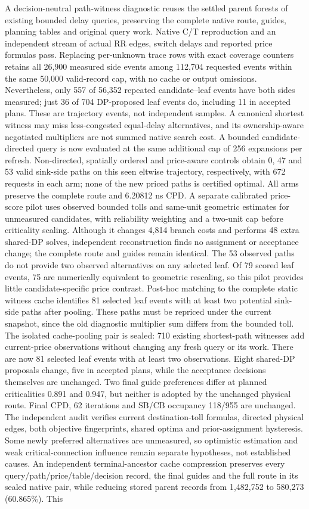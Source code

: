 \documentclass[conference,10pt]{IEEEtran}
\begin{document}
A decision-neutral path-witness diagnostic reuses the settled parent forests of existing bounded delay queries, preserving the complete native route, guides, planning tables and original query work. Native C/T reproduction and an independent stream of actual RR edges, switch delays and reported price formulas pass. Replacing per-unknown trace rows with exact coverage counters retains all 26,900 measured side events among 112,704 requested events within the same 50,000 valid-record cap, with no cache or output omissions. Nevertheless, only 557 of 56,352 repeated candidate--leaf events have both sides measured; just 36 of 704 DP-proposed leaf events do, including 11 in accepted plans. These are trajectory events, not independent samples. A canonical shortest witness may miss less-congested equal-delay alternatives, and its ownership-aware negotiated multipliers are not summed native search cost. A bounded candidate-directed query is now evaluated at the same additional cap of 256 expansions per refresh. Non-directed, spatially ordered and price-aware controls obtain 0, 47 and 53 valid sink-side paths on this seen eltwise trajectory, respectively, with 672 requests in each arm; none of the new priced paths is certified optimal. All arms preserve the complete route and 6.20812 ns CPD. A separate calibrated price-score pilot uses observed bounded tolls and same-unit geometric estimates for unmeasured candidates, with reliability weighting and a two-unit cap before criticality scaling. Although it changes 4,814 branch costs and performs 48 extra shared-DP solves, independent reconstruction finds no assignment or acceptance change; the complete route and guides remain identical. The 53 observed paths do not provide two observed alternatives on any selected leaf. Of 79 scored leaf events, 75 are numerically equivalent to geometric rescaling, so this pilot provides little candidate-specific price contrast. Post-hoc matching to the complete static witness cache identifies 81 selected leaf events with at least two potential sink-side paths after pooling. These paths must be repriced under the current snapshot, since the old diagnostic multiplier sum differs from the bounded toll. The isolated cache-pooling pair is sealed: 710 existing shortest-path witnesses add current-price observations without changing any fresh query or its work. There are now 81 selected leaf events with at least two observations. Eight shared-DP proposals change, five in accepted plans, while the acceptance decisions themselves are unchanged. Two final guide preferences differ at planned criticalities 0.891 and 0.947, but neither is adopted by the unchanged physical route. Final CPD, 62 iterations and SB/CB occupancy 118/955 are unchanged. The independent audit verifies current destination-toll formulas, directed physical edges, both objective fingerprints, shared optima and prior-assignment hysteresis. Some newly preferred alternatives are unmeasured, so optimistic estimation and weak critical-connection influence remain separate hypotheses, not established causes. An independent terminal-ancestor cache compression preserves every query/path/price/table/decision record, the final guides and the full route in its sealed native pair, while reducing stored parent records from 1,482,752 to 580,273 (60.865\%). This 
\end{document}
